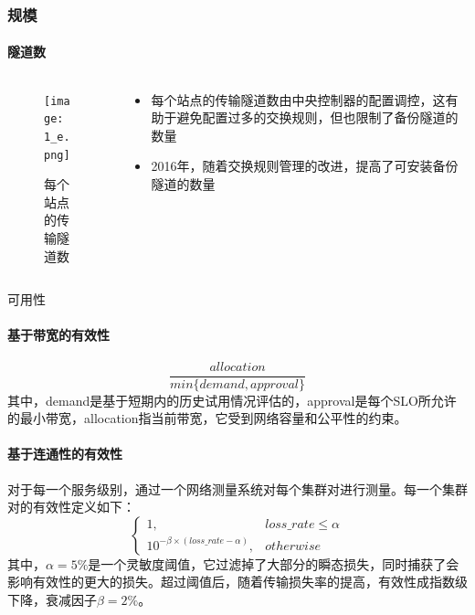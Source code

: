 \begin{frame}
    \frametitle{规模}
    \framesubtitle{隧道数}
    \begin{columns}
        \begin{column}{0.4\textwidth}
        \begin{figure}
            \centering
            \texttt{[image: 1\_e.png]}
            \caption{每个站点的传输隧道数}
        \end{figure}
        \end{column}
        
        \begin{column}{0.6\textwidth}
            \begin{itemize}
                \item 每个站点的传输隧道数由中央控制器的配置调控，这有助于避免配置过多的交换规则，但也限制了备份隧道的数量
                \item 2016年，随着交换规则管理的改进，提高了可安装备份隧道的数量
            \end{itemize}
        \end{column}
    \end{columns}
\end{frame}

\begin{frame}{可用性}
    \paragraph{基于带宽的有效性}
    \begin{equation*}
        \frac{allocation}{min\{demand, approval\}}
    \end{equation*}
    其中，demand是基于短期内的历史试用情况评估的，approval是每个SLO所允许的最小带宽，allocation指当前带宽，它受到网络容量和公平性的约束。
    \paragraph{基于连通性的有效性}对于每一个服务级别，通过一个网络测量系统对每个集群对进行测量。每一个集群对的有效性定义如下：
    \begin{equation*}
    \begin{cases}
    1,&loss\_rate\leq\alpha\\
    10^{-\beta\times(loss\_rate-\alpha)},&otherwise
    \end{cases}
    \end{equation*}
    其中，$\alpha=5\%$是一个灵敏度阈值，它过滤掉了大部分的瞬态损失，同时捕获了会影响有效性的更大的损失。超过阈值后，随着传输损失率的提高，有效性成指数级下降，衰减因子$\beta=2\%$。
\end{frame}

